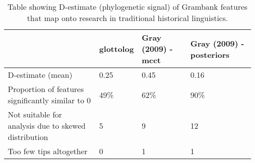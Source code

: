 \begin{table}[ht]
\centering
\begin{tabular}{p{6cm}p{2.2cm}p{2.2cm}p{2.2cm}}
  \hline
  & glottolog & Gray (2009) - mcct & Gray (2009) - posteriors \\ 
  \hline
D-estimate (mean) & 0.25 & 0.45 & 0.16 \\ 
  Proportion of features significantly similar to 0 & 49\% & 62\% & 90\% \\ 
  Not suitable for analysis due to skewed distribution & 5 & 9 & 12 \\ 
  Too few tips altogether & 0 & 1 & 1 \\ 
   \hline
\end{tabular}
\caption{Table showing D-estimate (phylogenetic signal) of Grambank features that map onto research in traditional historical linguistics.} 
\label{d_estimate_summary}
\end{table}
